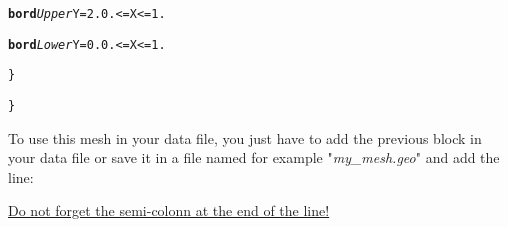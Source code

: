 \begin{center}
{\begin{minipage}[c]{0.9\textwidth}
\begin{alltt}
\hspace{2cm}            {\bf{bord}} \textit{Upper}   \hspace{0.25cm} Y = 2.  0. <= X <= 1.

\hspace{2cm}            {\bf{bord}} \textit{Lower}   \hspace{0.25cm} Y = 0.  0. <= X <= 1.

\hspace{1cm}        \}

\}
\end{alltt}
\end{minipage}}
\end{center}

To use this mesh in your data file, you just have to add the previous block in your data file or save it in a file named for example "\textit{my\_mesh.geo}" and add the line:\\
\begin{center}
\end{center}

\underline{Do not forget the semi-colonn at the end of the line!}\\




